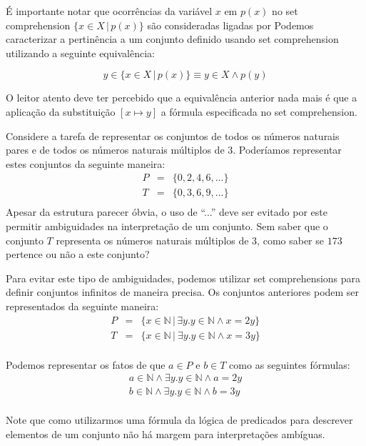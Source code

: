 É importante notar que ocorrências da variável $x$ em $p(x)$ no set
comprehension $\{x\in X\,|\,p(x)\}$ são consideradas ligadas por
Podemos caracterizar a pertinência a um conjunto definido usando set
comprehension utilizando a seguinte equivalência:

\[y\in\{x\in X \,|\, p(x)\} \equiv y\in X \land p(y)\]

O leitor atento deve ter percebido que a equivalência anterior nada
mais é que a aplicação da substituição $[x\mapsto y]$ a fórmula
especificada no set comprehension.

\begin{Example}
Considere a tarefa de representar os conjuntos de todos os números naturais
pares e de todos os números naturais múltiplos de 3. Poderíamos
representar estes conjuntos da seguinte maneira:
\[
\begin{array}{lcr}
P & = &\{0,2,4,6,...\}\\
T & = & \{0,3,6,9,...\}\\
\end{array}
\]
Apesar da estrutura parecer óbvia, o uso de ``...'' deve ser evitado
por este permitir ambiguidades na interpretação de um conjunto. Sem
saber que o conjunto $T$ representa os números naturais múltiplos de
3, como saber se $173$ pertence ou não a este conjunto?

Para evitar este tipo de ambiguidades, podemos utilizar set
comprehensions para definir conjuntos infinitos de maneira precisa. Os
conjuntos anteriores podem ser representados da seguinte maneira:
\[
\begin{array}{lcr}
P & = &\{x\in\mathbb{N}\,|\,\exists y. y\in \mathbb{N}\land x =
2y\}\\
T & = & \{x\in\mathbb{N}\,|\ \exists y. y\in\mathbb{N}\land x =
3y\}\\
\end{array}
\]

Podemos representar os fatos de que $a \in P$ e $b \in T$ como as
seguintes fórmulas:
\[
\begin{array}{l}
a \in \mathbb{N} \land \exists y. y\in\mathbb{N} \land a = 2y\\
b \in \mathbb{N} \land \exists y. y\in\mathbb{N} \land b = 3y\\
\end{array}
\]

Note que como utilizarmos uma fórmula da lógica de predicados para
descrever elementos de um conjunto não há margem para interpretações
ambíguas.
\end{Example}

